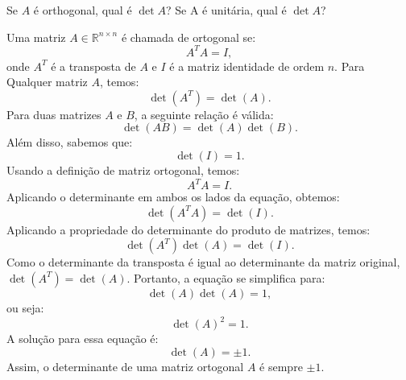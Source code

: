 \begin{question}
  Se $A$ é orthogonal, qual é $\det A$? Se A é unitária, qual é $\det A$?
\end{question}
\begin{resolution}
  Uma matriz $ A \in \mathbb{R}^{n \times n} $ é chamada de ortogonal se:
  \begin{equation}
    A^T A = I,
  \end{equation}
  onde $ A^T $ é a transposta de $ A $ e $ I $ é a matriz identidade de ordem $ n $. Para Qualquer matriz $ A $, temos:
  \begin{equation}
    \det(A^T) = \det(A).
  \end{equation}
  Para duas matrizes $ A $ e $ B $, a seguinte relação é válida:
  \begin{equation}
    \det(AB) = \det(A) \det(B).
  \end{equation}
  Além disso, sabemos que:
  \begin{equation}
    \det(I) = 1.
  \end{equation}
  Usando a definição de matriz ortogonal, temos:
  \begin{equation}
    A^T A = I.
  \end{equation}
  Aplicando o determinante em ambos os lados da equação, obtemos:
  \begin{equation}
    \det(A^T A) = \det(I).
  \end{equation}
  Aplicando a propriedade do determinante do produto de matrizes, temos:
  \begin{equation}
    \det(A^T) \det(A) = \det(I).
  \end{equation}
  Como o determinante da transposta é igual ao determinante da matriz original, $ \det(A^T) = \det(A) $. Portanto, a equação se simplifica para:
  \begin{equation}
    \det(A) \det(A) = 1,
  \end{equation}
  ou seja:
  \begin{equation}
    \det(A)^2 = 1.
  \end{equation}
  A solução para essa equação é:
  \begin{equation}
    \det(A) = \pm 1.
  \end{equation}
  Assim, o determinante de uma matriz ortogonal $ A $ é sempre $ \pm 1 $.


\end{resolution}
